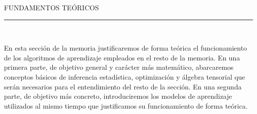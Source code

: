 \begin{titlepage}
\begin{center}

\textsc{ \Large FUNDAMENTOS TEÓRICOS\\[0.5cm]}
\noindent\rule[-1ex]{\textwidth}{3pt}\\[3.5ex]

\end{center}

\vspace{3cm}


\hspace{2.5cm} En esta sección de la memoria justificaremos de forma teórica el funcionamiento de los algoritmos de aprendizaje empleados en el resto de la memoria. En una primera parte, de objetivo general y carácter más matemático, abarcaremos conceptos básicos de inferencia estadística, optimización y álgebra tensorial que serán necesarios para el entendimiento del resto de la sección. En una segunda parte, de objetivo más concreto, introduciremos los modelos de aprendizaje utilizados al mismo tiempo que justificamos su funcionamiento de forma teórica.

\end{titlepage}

